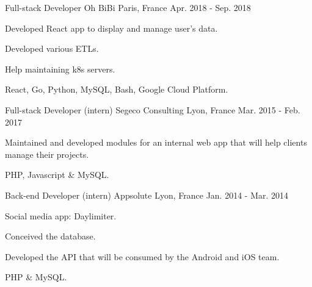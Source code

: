 

\begin{cventries}

  \cventry
  {Full-stack Developer} %
  {Oh BiBi} %
  {Paris, France} %
  {Apr. 2018 - Sep. 2018} %
    {
      \begin{cvitems} %
      \item {Developed React app to display and manage user's data.}
      \item {Developed various ETLs.}
      \item {Help maintaining k8s servers.}
      \item {React, Go, Python, MySQL, Bash, Google Cloud Platform.}
      \end{cvitems}
    }

  \cventry
  {Full-stack Developer (intern)} %
  {Segeco Consulting} %
  {Lyon, France} %
  {Mar. 2015 - Feb. 2017} %
    {
      \begin{cvitems} %
      \item {Maintained and developed modules for an internal web app that will help clients manage their projects.}
      \item {PHP, Javascript \& MySQL.}
      \end{cvitems}
    }

  \cventry
  {Back-end Developer (intern)} %
  {Appsolute} %
  {Lyon, France} %
  {Jan. 2014 - Mar. 2014} %
    {
      \begin{cvitems} %
      \item {Social media app: Daylimiter.}
      \item {Conceived the database.}
      \item {Developed the API that will be consumed by the Android and iOS team.}
      \item {PHP \& MySQL.}
      \end{cvitems}
    }


\end{cventries}

